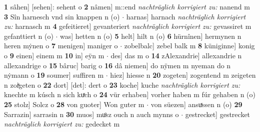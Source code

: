 \documentclass[8pt,a4paper,notitlepage]{article}
\begin{document}
\begin{table}[ht]
\begin{minipage}[t]{0.5\linewidth}
\textbf{1} sâhen] [sehen]: sehent o \textbf{2} nâmen] m::end \textit{nachträglich korrigiert zu:} nanend m \textbf{3} Sîn harnesch vnd sin knappen n (o)  $\cdot$ harnas] harnach \textit{nachträglich korrigiert zu:} harnasch m \textbf{4} gefeitieret] gevanteriert \textit{nachträglich korrigiert zu:} gevassiret m gefanttiert n (o)  $\cdot$ was] hetten n (o) \textbf{5} helt] hilt n (o) \textbf{6} hürnînen] hermynen n heren mẏnen o \textbf{7} menigen] maniger o  $\cdot$ zobelbalc] zebel balk m \textbf{8} küniginne] konig o \textbf{9} einen] einem m \textbf{10} in] eÿn m  $\cdot$ des] das m o \textbf{14} zAlexandrie] allexandrie n allexandrige o \textbf{15} bâruc] barig o \textbf{16} dâ niemen] do nÿmen m nyeman do n nẏmann o \textbf{19} soumer] suffiren m  $\cdot$ hiez] hiesse n \textbf{20} zogeten] zogentend m zeigeten n zoiͯgeten o \textbf{22} dort] [det]: dert o \textbf{23} koche] kuche \textit{nachträglich korrigiert zu:} knechte m kúsch n sich kuͯch o \textbf{24} vür erhaben] vorher haben m fúr gehaben n (o) \textbf{25} stolz] Solcz o \textbf{28} von guoter] Won guter m  $\cdot$ von süezen] ansuͯssen n (o) \textbf{29} Sarrazin] sarrasin n \textbf{30} muos] muͦsz ouch n auch mynns o  $\cdot$ gestrecket] gestrecket \textit{nachträglich korrigiert zu:} gedecket m \newline
\end{minipage}
\end{table}
\newpage
\end{document}
